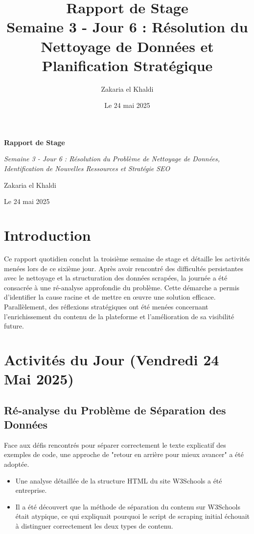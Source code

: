 \documentclass[12pt, a4paper]{article}
\title{\Huge\bfseries\color{primary} Rapport de Stage \\ 
      \Large Semaine 3 - Jour 6 : Résolution du Nettoyage de Données et Planification Stratégique} %
\author{\Large Zakaria el Khaldi}
\date{\large Le 24 mai 2025} %
\begin{document}
\begin{titlepage}
  \centering
  {\Huge\bfseries\color{primary} Rapport de Stage \par}
  \vspace{1cm}
  {\Large\itshape Semaine 3 - Jour 6 : Résolution du Problème de Nettoyage de Données, Identification de Nouvelles Ressources et Stratégie SEO\par} %
  \vspace{2cm}
  
  \vspace{2cm}
  {\Large Zakaria el Khaldi\par}
  \vfill
  {\large Le 24 mai 2025\par} %
\end{titlepage}

\tableofcontents
\thispagestyle{empty}
\newpage

\section{Introduction}
\thispagestyle{fancy}
Ce rapport quotidien conclut la troisième semaine de stage et détaille les activités menées lors de ce sixième jour. Après avoir rencontré des difficultés persistantes avec le nettoyage et la structuration des données scrapées, la journée a été consacrée à une ré-analyse approfondie du problème. Cette démarche a permis d'identifier la cause racine et de mettre en œuvre une solution efficace. Parallèlement, des réflexions stratégiques ont été menées concernant l'enrichissement du contenu de la plateforme et l'amélioration de sa visibilité future.

\section{Activités du Jour (Vendredi 24 Mai 2025)} %

\subsection{Ré-analyse du Problème de Séparation des Données}
Face aux défis rencontrés pour séparer correctement le texte explicatif des exemples de code, une approche de "retour en arrière pour mieux avancer" a été adoptée.
\begin{itemize}
    \item Une analyse détaillée de la structure HTML du site W3Schools a été entreprise.
    \item Il a été découvert que la méthode de séparation du contenu sur W3Schools était atypique, ce qui expliquait pourquoi le script de scraping initial échouait à distinguer correctement les deux types de contenu.
\end{itemize}
\end{document}
